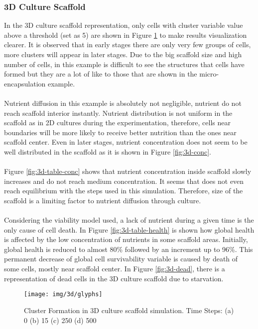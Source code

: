 \subsubsection{3D Culture Scaffold}
In the 3D culture scaffold representation, only cells with cluster variable value above a threshold (set as 5) are shown in Figure \ref{fig:3d-glyphs} to make results visualization clearer. It is observed that in early stages there are only very few groups of cells, more clusters will appear in later stages. Due to the big scaffold size and high number of cells, in this example is difficult to see the structures that cells have formed but they are a lot of like to those that are shown in the micro-encapsulation example.\\ 
\\
Nutrient diffusion in this example is absolutely not negligible, nutrient do not reach scaffold interior instantly. Nutrient distribution is not uniform in the scaffold as in 2D cultures during the experimentation, therefore, cells near boundaries will be more likely to receive better nutrition than the ones near scaffold center. Even in later stages, nutrient concentration does not seem to be well distributed in the scaffold as it is shown in Figure \ref{fig:3d-conc}.\\
\\
Figure \ref{fig:3d-table-conc} shows that nutrient concentration inside scaffold slowly increases and do not reach medium concentration. It seems that does not even reach equilibrium with the steps used in this simulation. Therefore, size of the scaffold is a limiting factor to nutrient diffusion through culture.\\
\\
Considering the viability model used, a lack of nutrient during a given time is the only cause of cell death. In Figure \ref{fig:3d-table-health} is shown how global health is affected by the low concentration of nutrients in some scaffold areas. Initially, global health is reduced to almost 80\% followed by an increment up to 96\%. This permanent decrease of global cell survivability variable is caused by death of some cells, mostly near scaffold center. In Figure \ref{fig:3d-dead}, there is a representation of dead cells in the 3D culture scaffold due to starvation.

\begin{figure}[H]
\centering
\setlength\fboxsep{0pt}
\setlength\fboxrule{0.5pt}
\texttt{[image: img/3d/glyphs]}
\caption{Cluster Formation in 3D culture scaffold simulation. Time Steps: (a) 0 (b) 15 (c) 250 (d) 500}
\label{fig:3d-glyphs}
\end{figure}

